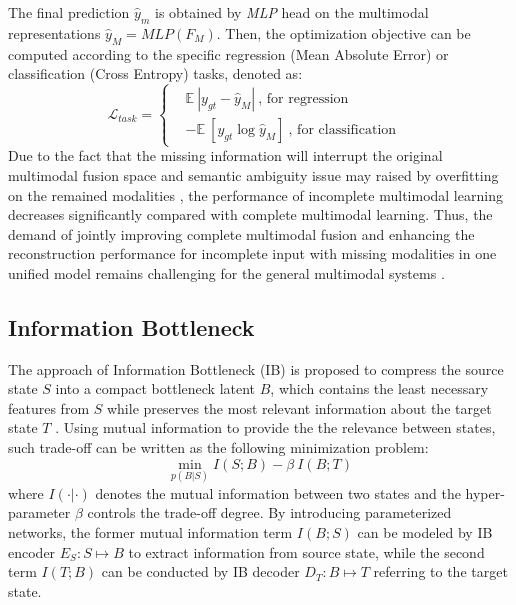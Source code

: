 \documentclass{article}
\begin{document}
The final prediction $\hat{y}_m$ is obtained by \textit{MLP} head on the multimodal representations $\hat{y}_M=MLP(F_M)$. Then, the optimization objective can be computed according to the specific regression (Mean Absolute Error) or classification (Cross Entropy) tasks, denoted as:
\begin{equation}
\mathcal{L}_{task} =\left\{
\begin{aligned}
    & \mathbb{E}\ |y_{gt} - \hat{y}_M| \ \text{, for regression }\\
    & -\mathbb{E}\ [y_{gt}\log\hat{y}_M]\ \text{, for classification }
    \end{aligned}
\right.\ \ 
\label{equ_task_loss}
\end{equation}
Due to the fact that the missing information will interrupt the original multimodal fusion space \cite{lian2023gcnet, lin2023missmodal} and semantic ambiguity issue may raised by overfitting on the remained modalities \cite{hazarika2022analyzing, ma2022multimodal}, the performance of incomplete multimodal learning decreases significantly compared with complete multimodal learning. Thus, the demand of jointly improving complete multimodal fusion and enhancing the reconstruction performance for incomplete input with missing modalities in one unified model remains challenging for the general multimodal systems \cite{lin2024adapt}.

\subsection{Information Bottleneck}
The approach of Information Bottleneck (IB) is proposed to compress the source state $S$ into a compact bottleneck latent $B$, which contains the  least necessary features from $S$ while preserves the most relevant information about the target state $T$ \cite{tishby1999information,tishby2015deepib,michael2018on}. Using mutual information to provide the the relevance between states, such trade-off can be written as the following minimization problem: 
\begin{equation}
\label{equ_mutual_info}
    \min_{p(B|S)} I(S;B) - \beta\ I(B;T)
\end{equation}
where $I(\cdot|\cdot)$ denotes the mutual information between two states and the hyper-parameter $\beta$ controls the trade-off degree. By introducing parameterized networks, the former mutual information term $I(B;S)$ can be modeled by IB encoder $E_S:S\mapsto B$ to extract information from source state, while the second term $I(T;B)$ can be conducted by IB decoder $D_T:B\mapsto T$ referring to the target state. 
\end{document}
